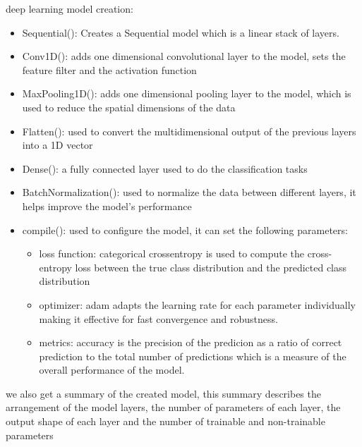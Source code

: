 deep learning model creation:
\firmlist
\begin{itemize}
	\item Sequential(): Creates a Sequential model which is a linear stack of layers.
	\item Conv1D(): adds one dimensional convolutional layer to the model, sets the feature filter and the activation function
	\item MaxPooling1D(): adds one dimensional pooling layer to the model, which is used to reduce the spatial dimensions of the data 
	\item Flatten(): used to convert the multidimensional output of the previous layers into a 1D vector
	\item Dense(): a fully connected layer used to do the classification tasks
	\item BatchNormalization(): used to normalize the data between different layers, it helps improve the model's performance
	\item compile(): used to configure the model, it can set the following parameters:
		\firmlist
		\begin{itemize}
			\item loss function: categorical crossentropy is used to compute the cross-entropy loss between the true class distribution and the predicted class distribution
			\item optimizer: adam adapts the learning rate for each parameter individually making it effective for fast convergence and robustness.
			\item metrics: accuracy is the precision of the predicion as a ratio of correct prediction to the total number of predictions which is a measure of the overall performance of the model. 
		\end{itemize}
\end{itemize}

we also get a summary of the created model, this summary describes the arrangement of the model layers, the number of parameters of each layer, the output shape of each layer and the number of trainable and non-trainable parameters


\newpage

